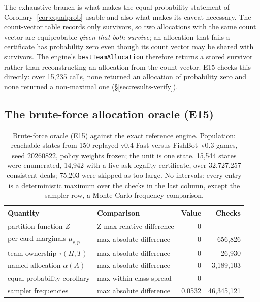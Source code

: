 \documentclass[11pt]{article}
\theoremstyle{definition}
\DeclareRobustCommand{\vfast}{\texorpdfstring{\mbox{v0.4-Fast}}{v0.4-Fast}}
\DeclareRobustCommand{\vthree}{\texorpdfstring{\mbox{FishBot v0.3}}{FishBot v0.3}}
\newcommand{\numOracleStates}{15{,}544}
\newcommand{\numOracleStatesCFive}{14{,}942}
\newcommand{\numOracleStatesSkipped}{75{,}203}
\newcommand{\numOracleDeals}{32{,}727{,}257}
\newcommand{\numOracleBestChecks}{15{,}235}
\newcommand{\numOracleGames}{150}
\begin{document}
The exhaustive branch is what makes the equal-probability statement of
Corollary~\ref{cor:equalprob} usable and also what makes its caveat necessary.
The count-vector table records only survivors, so two allocations with the same
count vector are equiprobable \emph{given that both survive}; an allocation that
fails a certificate has probability zero even though its count vector may be
shared with survivors. The engine's \texttt{bestTeamAllocation} therefore returns
a stored survivor rather than reconstructing an allocation from the count vector.
E15 checks this directly: over \numOracleBestChecks{} calls, none returned an
allocation of probability zero and none returned a non-maximal one
(\S\ref{sec:results-verify}).

\subsection{The brute-force allocation oracle (E15)}
\label{app:oracle}

\begin{table}[!htbp]
\centering
\caption{Brute-force oracle (E15) against the exact reference engine.
Population: reachable states from \numOracleGames{} replayed \vfast{} versus
\vthree{} games, seed $20260822$, policy weights frozen; the unit is one state.
\numOracleStates{} states were enumerated, \numOracleStatesCFive{} with a live
ask-legality certificate, over \numOracleDeals{} consistent deals;
\numOracleStatesSkipped{} were skipped as too large. No intervals: every entry is
a deterministic maximum over the checks in the last column, except the sampler
row, a Monte-Carlo frequency comparison.}
\label{tab:oracle}
\small
\begin{tabular}{llrr}
\toprule
Quantity & Comparison & Value & Checks \\
\midrule
partition function $Z$ & Z max relative difference & $0$ & --- \\
per-card marginals $\mu_{c,p}$ & max absolute difference & $0$ & 656{,}826 \\
team ownership $\tau(H,T)$ & max absolute difference & $0$ & 26{,}930 \\
named allocation $\alpha(A)$ & max absolute difference & $0$ & 3{,}189{,}103 \\
equal-probability corollary & max within-class spread & $0$ & --- \\
sampler frequencies & max absolute difference & 0.0532 & 46{,}345{,}121 \\
\bottomrule
\end{tabular}%
\end{table}
\end{document}

